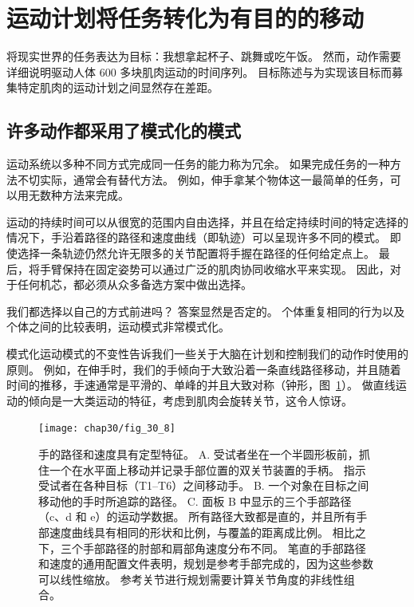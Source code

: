 \section{运动计划将任务转化为有目的的移动}

将现实世界的任务表达为目标：我想拿起杯子、跳舞或吃午饭。
然而，动作需要详细说明驱动人体 600 多块肌肉运动的时间序列。
目标陈述与为实现该目标而募集特定肌肉的运动计划之间显然存在差距。



\subsection{许多动作都采用了模式化的模式}

运动系统以多种不同方式完成同一任务的能力称为冗余。
如果完成任务的一种方法不切实际，通常会有替代方法。
例如，伸手拿某个物体这一最简单的任务，可以用无数种方法来完成。


运动的持续时间可以从很宽的范围内自由选择，并且在给定持续时间的特定选择的情况下，手沿着路径的路径和速度曲线（即轨迹）可以呈现许多不同的模式。
即使选择一条轨迹仍然允许无限多的关节配置将手握在路径的任何给定点上。
最后，将手臂保持在固定姿势可以通过广泛的肌肉协同收缩水平来实现。
因此，对于任何机芯，都必须从众多备选方案中做出选择。


我们都选择以自己的方式前进吗？
答案显然是否定的。
个体重复相同的行为以及个体之间的比较表明，运动模式非常模式化。


模式化运动模式的不变性告诉我们一些关于大脑在计划和控制我们的动作时使用的原则。
例如，在伸手时，我们的手倾向于大致沿着一条直线路径移动，并且随着时间的推移，手速通常是平滑的、单峰的并且大致对称（钟形，图~\ref{fig:30_8}）。
做直线运动的倾向是一大类运动的特征，考虑到肌肉会旋转关节，这令人惊讶。


\begin{figure}[htbp]
	\centering
	\texttt{[image: chap30/fig\_30\_8]}
	\caption{手的路径和速度具有定型特征\cite{morasso1981spatial}。
		A. 受试者坐在一个半圆形板前，抓住一个在水平面上移动并记录手部位置的双关节装置的手柄。
		指示受试者在各种目标（T1–T6）之间移动手。
		B. 一个对象在目标之间移动他的手时所追踪的路径。
		C. 面板 B 中显示的三个手部路径（c、d 和 e）的运动学数据。
		所有路径大致都是直的，并且所有手部速度曲线具有相同的形状和比例，与覆盖的距离成比例。
		相比之下，三个手部路径的肘部和肩部角速度分布不同。
		笔直的手部路径和速度的通用配置文件表明，规划是参考手部完成的，因为这些参数可以线性缩放。
		参考关节进行规划需要计算关节角度的非线性组合。}
	\label{fig:30_8}
\end{figure}


